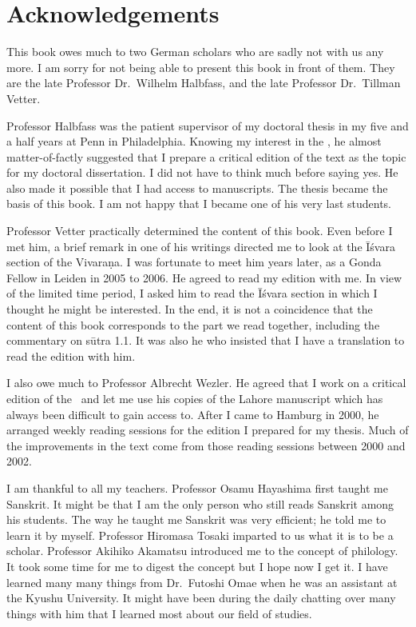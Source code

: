 \chapter{Acknowledgements}


This book owes much to two German scholars who are sadly not with us any more. I am sorry for not being able to present this book in front of them. They are the late Professor Dr.\ Wilhelm Halbfass, and the late Professor Dr.\ Tillman Vetter. 

Professor Halbfass was the patient supervisor of my doctoral thesis in my five and a half years at Penn in Philadelphia. Knowing my interest in the \PYSV, he almost matter-of-factly suggested that I prepare a critical edition of the text as the topic for my doctoral dissertation. I did not have to think much before saying yes. He also made it possible that I had access to manuscripts. The thesis became the basis of this book. I am not happy that I became one of his very last students. 

Professor Vetter practically determined the content of this book. Even before I met him, a brief remark in one of his writings directed me to look at the Īśvara section of the Vivaraṇa. I was fortunate to meet him years later, as a Gonda Fellow in Leiden in 2005 to 2006. He agreed to read my edition with me. In view of the limited time period, I asked him to read the Īśvara section in which I thought he might be interested. In the end, it is not a coincidence that the content of this book corresponds to the part we read together, including the commentary on sūtra 1.1. It was also he who insisted that I have a translation to read the edition with him. 

I also owe much to Professor Albrecht Wezler. He agreed that I work on a critical edition of the \PYSV\ and let me use his copies of the Lahore manuscript which has always been difficult to gain access to. After I came to Hamburg in 2000, he arranged weekly reading sessions for the edition I prepared for my thesis. Much of the improvements in the text come from those reading sessions between 2000 and 2002.

I am thankful to all my teachers. Professor Osamu Hayashima first taught me Sanskrit. It might be that I am the only person who still reads Sanskrit among his students. The way he taught me Sanskrit was very efficient; he told me to learn it by myself. Professor Hiromasa Tosaki imparted to us what it is to be a scholar. Professor Akihiko Akamatsu introduced me to the concept of philology. It took some time for me to digest the concept but I hope now I get it. I have learned many many things from Dr.\ Futoshi Omae when he was an assistant at the Kyushu University. It might have been during the daily chatting over many things with him that I learned most about our field of studies.

